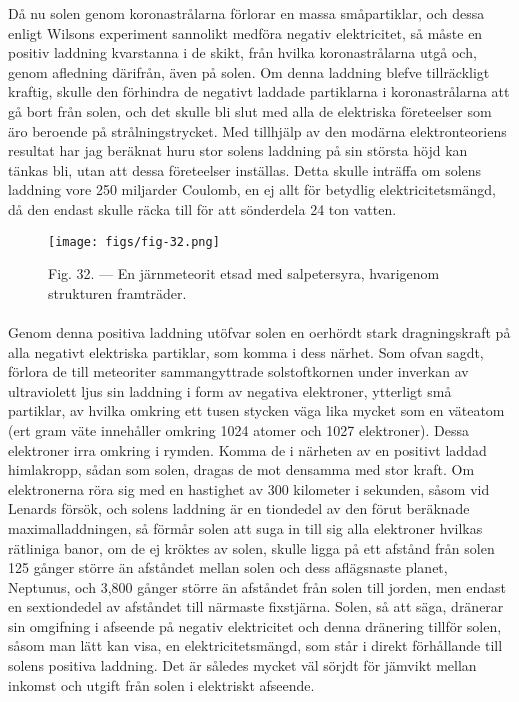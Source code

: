 \documentclass[a4paper, 12pt, oneside, swedish]{article}
\begin{document}
Då nu solen genom koronastrålarna förlorar en massa småpartiklar, och dessa enligt Wilsons experiment sannolikt medföra negativ elektricitet, så måste en positiv laddning kvarstanna i de skikt, från hvilka koronastrålarna utgå och, genom afledning därifrån, även på solen. Om denna laddning blefve tillräckligt kraftig, skulle den förhindra de negativt laddade partiklarna i koronastrålarna att gå bort från solen, och det skulle bli slut med alla de elektriska företeelser som äro beroende på strålningstrycket. Med tillhjälp av den modärna elektronteoriens resultat har jag beräknat huru stor solens laddning på sin största höjd kan tänkas bli, utan att dessa företeelser inställas. Detta skulle inträffa om solens laddning vore 250 miljarder Coulomb, en ej allt för betydlig elektricitetsmängd, då den endast skulle räcka till för att sönderdela 24 ton vatten.

\begin{figure}[H]
\centering
\texttt{[image: figs/fig-32.png]}
\caption{Fig. 32. --- En järnmeteorit etsad med salpetersyra, hvarigenom strukturen framträder.}
\end{figure}
\paragraph{}
Genom denna positiva laddning utöfvar solen en oerhördt stark dragningskraft på alla negativt elektriska partiklar, som komma i dess närhet. Som ofvan sagdt, förlora de till meteoriter sammangyttrade solstoftkornen under inverkan av ultraviolett ljus sin laddning i form av negativa elektroner, ytterligt små partiklar, av hvilka omkring ett tusen stycken väga lika mycket som en väteatom (ert gram väte innehåller omkring 1024 atomer och 1027 elektroner). Dessa elektroner irra omkring i rymden. Komma de i närheten av en positivt laddad himlakropp, sådan som solen, dragas de mot densamma med stor kraft. Om elektronerna röra sig med en hastighet av 300 kilometer i sekunden, såsom vid Lenards försök, och solens laddning är en tiondedel av den förut beräknade maximalladdningen, så förmår solen att suga in till sig alla elektroner hvilkas rätliniga banor, om de ej kröktes av solen, skulle ligga på ett afstånd från solen 125 gånger större än afståndet mellan solen och dess aflägsnaste planet, Neptunus, och 3,800 gånger större än afståndet från solen till jorden, men endast en sextiondedel av afståndet till närmaste fixstjärna. Solen, så att säga, dränerar sin omgifning i afseende på negativ elektricitet och denna dränering tillför solen, såsom man lätt kan visa, en elektricitetsmängd, som står i direkt förhållande till solens positiva laddning. Det är således mycket väl sörjdt för jämvikt mellan inkomst och utgift från solen i elektriskt afseende.
\end{document}
